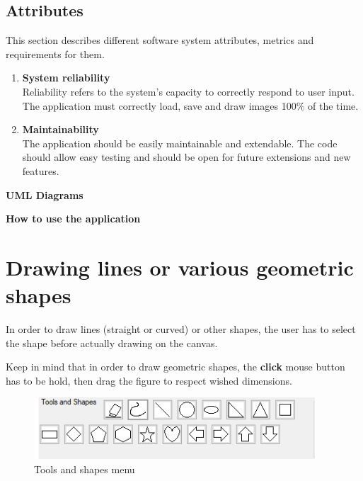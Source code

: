 \documentclass[12pt]{article}
\begin{document}
\subsection{Attributes}
This section describes different software system attributes, metrics and requirements for them.
\begin{enumerate}
\item \textbf{ System reliability}
\\
Reliability refers to the system's capacity to correctly respond to user input.
The application must correctly load, save and draw images 100\% of the time.
\item \textbf{Maintainability}
\\
The application should be easily maintainable and extendable.
The code should allow easy testing and should be open for future extensions and new features. 
\end{enumerate}

\clearpage
\vspace*{\fill}
\begin{center}
{\huge \textbf{UML Diagrams}}
\end{center}
\vfill 
\clearpage

\clearpage
\vspace*{\fill}
\begin{center}
\setcounter{page}{15}
{\huge \textbf{How to use the application}}
\end{center}
\vfill 
\clearpage

\section*{Drawing lines or various geometric shapes}

In order to draw lines (straight or curved) or other shapes, the user has to select the shape before actually drawing on the canvas.

Keep in mind that in order to draw geometric shapes, the \textbf{click} mouse button has to be hold, then drag the figure to respect wished dimensions.

\begin{figure}[h]
\centering
\includegraphics[width=10.5cm]{graphics/tools_and_shapes.png}
\caption{Tools and shapes menu}
\end{figure}
\end{document}
